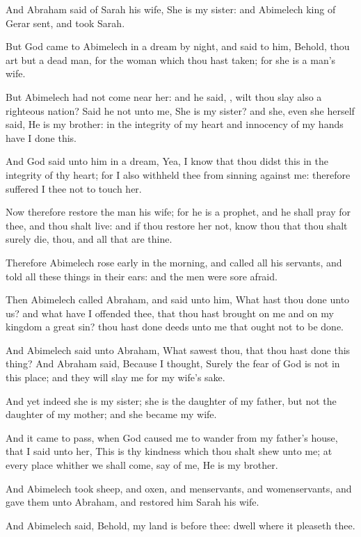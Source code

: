 \verse And Abraham said of Sarah his wife, She is my sister: and
Abimelech king of Gerar sent, and took Sarah.

\verse But God came to Abimelech in a dream by night, and said to him,
Behold, thou art but a dead man, for the woman which thou hast taken;
for she is a man's wife.

\verse But Abimelech had not come near her: and he said, \LORD, wilt thou
slay also a righteous nation?  \verse Said he not unto me, She is my
sister? and she, even she herself said, He is my brother: in the
integrity of my heart and innocency of my hands have I done this.

\verse And God said unto him in a dream, Yea, I know that thou didst
this in the integrity of thy heart; for I also withheld thee from
sinning against me: therefore suffered I thee not to touch her.

\verse Now therefore restore the man his wife; for he is a prophet, and
he shall pray for thee, and thou shalt live: and if thou restore her
not, know thou that thou shalt surely die, thou, and all that are
thine.

\verse Therefore Abimelech rose early in the morning, and called all his
servants, and told all these things in their ears: and the men were
sore afraid.

\verse Then Abimelech called Abraham, and said unto him, What hast thou
done unto us? and what have I offended thee, that thou hast brought on
me and on my kingdom a great sin? thou hast done deeds unto me that
ought not to be done.

\verse And Abimelech said unto Abraham, What sawest thou, that thou
hast done this thing?  \verse And Abraham said, Because I thought,
Surely the fear of God is not in this place; and they will slay me for
my wife's sake.

\verse And yet indeed she is my sister; she is the daughter of my
father, but not the daughter of my mother; and she became my wife.

\verse And it came to pass, when God caused me to wander from my
father's house, that I said unto her, This is thy kindness which thou
shalt shew unto me; at every place whither we shall come, say of me,
He is my brother.

\verse And Abimelech took sheep, and oxen, and menservants, and
womenservants, and gave them unto Abraham, and restored him Sarah his
wife.

\verse And Abimelech said, Behold, my land is before thee: dwell where
it pleaseth thee.

